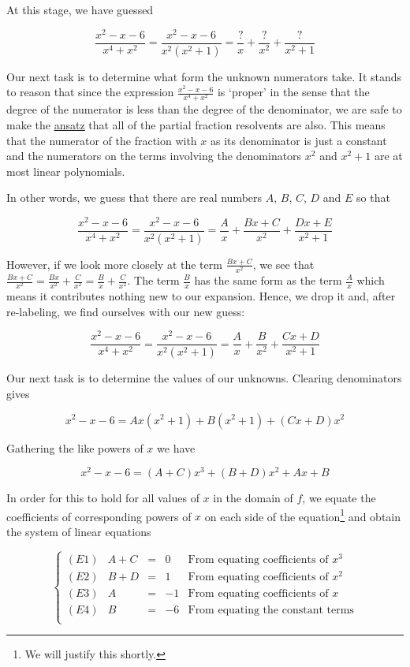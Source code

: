 At this stage, we have guessed

\[ \dfrac{x^2-x-6}{x^4+x^2} =  \dfrac{x^2-x-6}{x^2 \left(x^2+1\right)} = \dfrac{?}{x} + \dfrac{?}{x^2} + \dfrac{?}{x^2+1} \]

Our next task is to determine what form the unknown numerators take. It stands to reason that since the expression $\frac{x^2-x-6}{x^4+x^2}$ is `proper' in the sense that the degree of the numerator is less than the degree of the denominator, we are safe to make the \href{http://en.wikipedia.org/wiki/Ansatz}{\underline{ansatz}} that all of the partial fraction resolvents are also.  This means that the numerator of the fraction with $x$ as its denominator is just a constant and the numerators on the terms involving the denominators $x^2$ and $x^2+1$ are at most linear polynomials.  

In other words, we guess that there are real numbers $A$, $B$, $C$, $D$ and $E$ so that

\[ \dfrac{x^2-x-6}{x^4+x^2} =  \dfrac{x^2-x-6}{x^2 \left(x^2+1\right)} = \dfrac{A}{x} + \dfrac{Bx+C}{x^2} + \dfrac{Dx+E}{x^2+1} \]

However, if we look more closely at the term $\frac{Bx+C}{x^2}$, we see that $\frac{Bx+C}{x^2} = \frac{Bx}{x^2} + \frac{C}{x^2} = \frac{B}{x} + \frac{C}{x^2}$. The term $\frac{B}{x}$ has the same form as the term $\frac{A}{x}$ which means it contributes nothing new to our expansion.  Hence, we drop it and, after re-labeling, we find ourselves with our new guess:

\[ \dfrac{x^2-x-6}{x^4+x^2} =  \dfrac{x^2-x-6}{x^2 \left(x^2+1\right)} = \dfrac{A}{x} + \dfrac{B}{x^2} + \dfrac{Cx+D}{x^2+1} \] 

Our next task is to determine the values of our unknowns. Clearing denominators gives

\[x^2 - x- 6 = Ax\left(x^2+1\right) + B\left(x^2+1\right) + (Cx+D)x^2 \]

Gathering the like powers of $x$ we have

\[x^2 - x - 6 = (A+C)x^3+(B+D)x^2+Ax + B \]

In order for this to hold for all values of $x$ in the domain of $f$, we equate the coefficients of corresponding powers of $x$ on each side of the equation\footnote{We will justify this shortly.} and obtain the system of linear equations

\[ \left\{ \begin{array}{lrcrl} 
(E1) & A+C & = & 0 & \text{From equating coefficients of $x^{3}$} \\
(E2) & B+D & = & 1 & \text{From equating coefficients of $x^{2}$} \\
(E3) & A & = & -1 & \text{From equating coefficients of $x$} \\
(E4) & B & = & -6 & \text{From equating the constant terms} \\
\end{array} \right. \]

